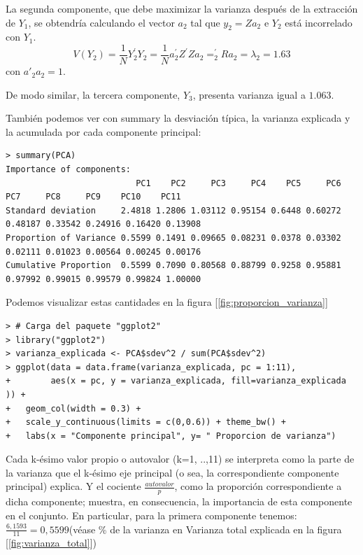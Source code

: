 \documentclass[12pt,twoside]{report}
\begin{document}
La segunda componente, que debe maximizar la varianza después de la extracción de $Y_1$, se obtendría calculando el vector $a_2$ tal que
$ y_2 = Za_2$ e $Y_2$ está incorrelado con $Y_1$.
$$ V(Y_2) = \frac{1}{N}Y^{'}_2Y_2 = \frac{1}{N}a^{'}_2Z^{'}Za_2 = ^{'}_2Ra_2 = \lambda_2 =1.63 $$ con $a'_2a_2 =1$.

De modo similar, la tercera componente, $Y_3$, presenta varianza igual a $1.063$.

También podemos ver con summary la desviación típica, la varianza explicada y la acumulada por cada componente principal:
\scriptsize \begin{verbatim}
> summary(PCA) 
Importance of components:
                          PC1    PC2     PC3     PC4    PC5     PC6     PC7     PC8     PC9    PC10    PC11
Standard deviation     2.4818 1.2806 1.03112 0.95154 0.6448 0.60272 0.48187 0.33542 0.24916 0.16420 0.13908
Proportion of Variance 0.5599 0.1491 0.09665 0.08231 0.0378 0.03302 0.02111 0.01023 0.00564 0.00245 0.00176
Cumulative Proportion  0.5599 0.7090 0.80568 0.88799 0.9258 0.95881 0.97992 0.99015 0.99579 0.99824 1.00000
\end{verbatim}
\normalsize

Podemos visualizar estas cantidades en la figura [\ref{fig:proporcion_varianza}]

\begin{lstlisting}
> # Carga del paquete "ggplot2" 
> library("ggplot2")
> varianza_explicada <- PCA$sdev^2 / sum(PCA$sdev^2)
> ggplot(data = data.frame(varianza_explicada, pc = 1:11),
+        aes(x = pc, y = varianza_explicada, fill=varianza_explicada )) +
+   geom_col(width = 0.3) +
+   scale_y_continuous(limits = c(0,0.6)) + theme_bw() +
+   labs(x = "Componente principal", y= " Proporcion de varianza")
\end{lstlisting}

Cada k-ésimo valor propio o autovalor (k=1, ..,11) se interpreta como la parte de la varianza que el k-ésimo eje principal (o sea, la correspondiente componente principal) explica. Y el cociente $\frac{autovalor}{p}$, como la proporción correspondiente a dicha componente; muestra, en consecuencia, la importancia de esta componente en el conjunto.
En particular, para la primera componente tenemos: $\frac{6,1593}{11} =  0,5599 $(véase \% de la varianza en Varianza total explicada en la figura [\ref{fig:varianza_total}])
\end{document}
